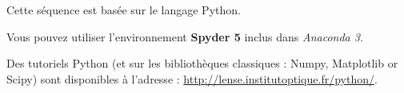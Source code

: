 Cette séquence est basée sur le langage Python.

Vous pouvez utiliser %
l'environnement \textbf{Spyder 5} inclus dans \textit{Anaconda 3}.

Des tutoriels Python (et sur les bibliothèques classiques : Numpy, Matplotlib or Scipy) sont disponibles à l'adresse : \href{http://lense.institutoptique.fr/python/}{http://lense.institutoptique.fr/python/}. 
